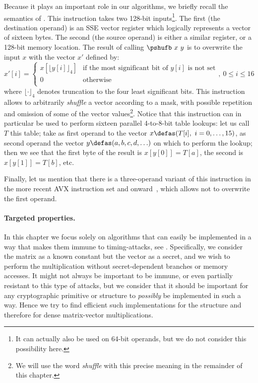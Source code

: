 Because it plays an important role in our algorithms, we briefly recall the semantics of \pshufb{}.
This instruction takes two 128-bit inputs\footnote{It can actually also be used on 64-bit operands, but we do not
consider this possibility here.}. The first (the destination operand) is an \xmm{} SSE vector register which logically represents
a vector of sixteen bytes. The second (the source operand) is either a similar \xmm{} register, or a 128-bit memory location. The result of calling
$\pshufb~x~y$ is to overwrite the input $x$ with the vector $x'$ defined by:
\[
x'[i] = \left\{
				\begin{array}{ll}
				x[\lfloor y[i]\rfloor_4]  & \text{if the most significant bit of $y[i]$ is not set}\\
				0 & \text{otherwise} \\
				\end{array}
		,~0\leq i \leq 16
		\right.
\]
where $\lfloor\cdot\rfloor_4$ denotes truncation to the four least significant bits.
This instruction allows to arbitrarily \emph{shuffle} a vector according to a mask, with possible repetition and omission of some of the vector
values\footnote{We will use the word \emph{shuffle} with this precise meaning in the remainder of this chapter.}.
Notice that this instruction can in particular be used to perform sixteen parallel 4-to-8-bit table lookups: let us call $T$ this table; take
as first operand to \pshufb{} the vector $x \defas (T[i],~i = 0,\ldots,15)$, as second operand the vector
$y \defas (a, b, c, d, \ldots)$
on which to perform the lookup; then we see that the first byte of the result is $x[y[0]] = T[a]$, the second is $x[y[1]] = T[b]$,
etc.

Finally, let us mention that there is a three-operand variant of this instruction in the more recent AVX instruction set and onward~\cite{ia64},
which allows not to overwrite the first operand.


\paragraph{Targeted properties.} In this chapter we focus solely on algorithms that can easily be implemented in a way that makes
them immune to timing-attacks, see \eg \cite{timinattacks}. Specifically, we consider the matrix as a known constant but the vector as a secret, and we wish to perform
the multiplication without secret-dependent branches or memory accesses. It might not always be important to be immune, or even partially resistant to this type
of attacks, but we consider that it should be important for any cryptographic primitive or structure to \emph{possibly} be implemented in such a way. Hence we try
to find efficient such implementations for the \shark{} structure and therefore for dense matrix-vector multiplications.

